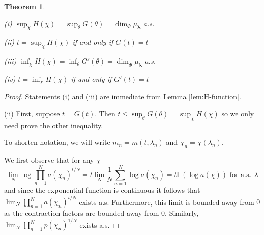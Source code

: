 \documentclass[10pt,a4paper]{amsart}
\newtheorem{theorem}{Theorem}
\newcommand{\blambda}{{\boldsymbol{\lambda}}}
\newcommand{\ee}{{\mathbb E}}
\newcommand{\odim}{\overline{\dim}}
\newcommand{\udim}{\underline{\dim}}
\begin{document}
\begin{theorem} \label{thm:G(t)=t}

(i) $\sup_{\chi }H(\chi )=\sup_{\theta }G(\theta )=\odim_\Phi\mu_\blambda $ a.s.

(ii) $t= \sup_{\chi }H(\chi )$ if and only if $G(t)=t$

(iii) $\inf_\chi H(\chi) = \inf_\theta G'(\theta) = \udim_\Phi \mu_\blambda$ a.s.

(iv) $t = \inf_\chi H(\chi)$ if and only if $G'(t) = t$
 
\end{theorem}

\begin{proof}
Statements (i) and (iii) are immediate from Lemma \ref{lem:H-function}.

(ii) First, suppose $t=G(t)$. 
Then $t\leq \sup_{\theta }G(\theta)=\sup_{\chi }H(\chi )$ so we only need prove the other inequality.

To shorten notation, we will write $m_{n}=m(t,\lambda _{n})$ and $\chi _{n}=\chi(\lambda _{n})$.

We first observe that for any $\chi$  
\begin{equation*}
      \lim_{N}\log \prod_{n=1}^{N}a(\chi _{n})^{t/N}=
    t\lim_{N}\frac{1}{N}\sum_{n=1}^{N}\log a(\chi _{n})=
   t\ee(\log a(\chi ))\text{ for a.a. } \lambda 
\end{equation*}
and since the exponential function is continuous it follows that $\lim_{N}\prod_{n=1}^{N}a(\chi _{n})^{t/N}$ exists a.s.  
Furthermore, this limit is bounded away from $0$ as the contraction factors are bounded away from $0$. 
Similarly, $\lim_{N}\prod_{n=1}^{N}p(\chi _{n})^{1/N}$ exists a.s.


\end{proof}
\end{document}
